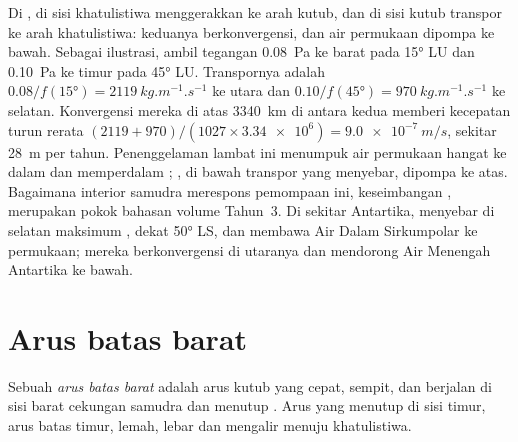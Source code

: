 Di ,  di sisi khatulistiwa menggerakkan  ke arah kutub, dan  di sisi kutub transpor ke arah khatulistiwa: keduanya berkonvergensi, dan air permukaan dipompa ke bawah. Sebagai ilustrasi, ambil tegangan \qty{0.08}{Pa} ke barat pada \ang{15} LU dan \qty{0.10}{Pa} ke timur pada \ang{45} LU. Transpornya adalah $0.08/f(\ang{15}) = \qty{2119}{kg.m^{-1}.s^{-1}}$ ke utara dan $0.10/f(\ang{45}) =
\qty{970}{kg.m^{-1}.s^{-1}}$ ke selatan. Konvergensi mereka di atas \qty{3340}{km} di antara kedua  memberi kecepatan turun rerata $(2119 + 970)/(1027 \times \num{3.34e6}) = \qty{9.0e-7}{m/s}$, sekitar \qty{28}{m} per tahun. Penenggelaman lambat ini menumpuk air permukaan hangat ke dalam  dan memperdalam ; , di bawah transpor yang menyebar, dipompa ke atas. Bagaimana interior samudra merespons pemompaan ini, keseimbangan , merupakan pokok bahasan volume Tahun~3. Di sekitar Antartika,  menyebar di selatan maksimum , dekat \ang{50} LS, dan membawa Air Dalam Sirkumpolar ke permukaan; mereka berkonvergensi di utaranya dan mendorong Air Menengah Antartika ke bawah.

\section{Arus batas barat}\label{sec:b1:ocean-circulation:wbc}

\begin{definition}\label{def:b1:ocean-circulation:wbc}
Sebuah \emph{arus batas barat} adalah arus kutub yang cepat, sempit, dan berjalan di sisi barat cekungan samudra dan menutup . Arus yang menutup  di sisi timur, arus batas timur, lemah, lebar dan mengalir menuju khatulistiwa.
\end{definition}

